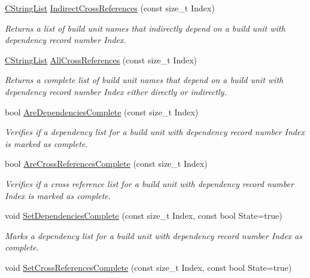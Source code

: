 \begin{DoxyCompactItemize}
\hyperlink{classCStringList}{C\-String\-List} \hyperlink{classCDependencyInfo_aa2a9f2ea3bc0e5f3b71603a477fc5619}{Indirect\-Cross\-References} (const size\-\_\-t Index)
\begin{DoxyCompactList}\small\item\em Returns a list of build unit names that indirectly depend on a build unit with dependency record number {\itshape Index}. \end{DoxyCompactList}\item 
\hyperlink{classCStringList}{C\-String\-List} \hyperlink{classCDependencyInfo_ab07c351a53409894d86e9e10f7a70f7f}{All\-Cross\-References} (const size\-\_\-t Index)
\begin{DoxyCompactList}\small\item\em Returns a complete list of build unit names that depend on a build unit with dependency record number {\itshape Index} either directly or indirectly. \end{DoxyCompactList}\item 
bool \hyperlink{classCDependencyInfo_a3325672b42de84d6043fe47c666350a0}{Are\-Dependencies\-Complete} (const size\-\_\-t Index)
\begin{DoxyCompactList}\small\item\em Verifies if a dependency list for a build unit with dependency record number {\itshape Index} is marked as complete. \end{DoxyCompactList}\item 
bool \hyperlink{classCDependencyInfo_ae1ffc10e98443e562d6b8a8d7b1a869f}{Are\-Cross\-References\-Complete} (const size\-\_\-t Index)
\begin{DoxyCompactList}\small\item\em Verifies if a cross reference list for a build unit with dependency record number {\itshape Index} is marked as complete. \end{DoxyCompactList}\item 
void \hyperlink{classCDependencyInfo_aab60680f8f1c33981e9abe0ba132d744}{Set\-Dependencies\-Complete} (const size\-\_\-t Index, const bool State=true)
\begin{DoxyCompactList}\small\item\em Marks a dependency list for a build unit with dependency record number {\itshape Index} as complete. \end{DoxyCompactList}\item 
void \hyperlink{classCDependencyInfo_a433798f74d8db352e22dd5e4fd1268af}{Set\-Cross\-References\-Complete} (const size\-\_\-t Index, const bool State=true)

\end{DoxyCompactItemize}
